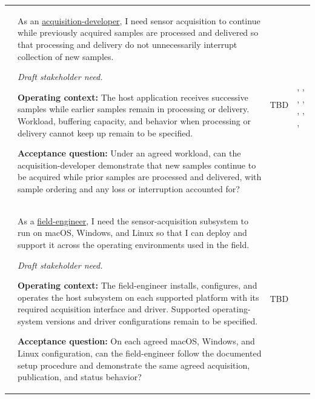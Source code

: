 \begin{tabularx}{\linewidth}{L{1.9cm}YL{1.8cm}L{3.4cm}}
 & As an \hyperref[Stakeholder:AcquisitionDeveloper]{acquisition-developer}, I need sensor acquisition to continue while previously acquired samples are processed and delivered so that processing and delivery do not unnecessarily interrupt collection of new samples. \par\textit{Draft stakeholder need.} \par\textbf{Operating context:} The host application receives successive samples while earlier samples remain in processing or delivery. Workload, buffering capacity, and behavior when processing or delivery cannot keep up remain to be specified. \par\textbf{Acceptance question:} Under an agreed workload, can the acquisition-developer demonstrate that new samples continue to be acquired while prior samples are processed and delivered, with sample ordering and any loss or interruption accounted for? & TBD & , , , , , , , \\
 & As a \hyperref[Stakeholder:FieldEngineer]{field-engineer}, I need the sensor-acquisition subsystem to run on macOS, Windows, and Linux so that I can deploy and support it across the operating environments used in the field. \par\textit{Draft stakeholder need.} \par\textbf{Operating context:} The field-engineer installs, configures, and operates the host subsystem on each supported platform with its required acquisition interface and driver. Supported operating-system versions and driver configurations remain to be specified. \par\textbf{Acceptance question:} On each agreed macOS, Windows, and Linux configuration, can the field-engineer follow the documented setup procedure and demonstrate the same agreed acquisition, publication, and status behavior? & TBD & \\

\end{tabularx}
